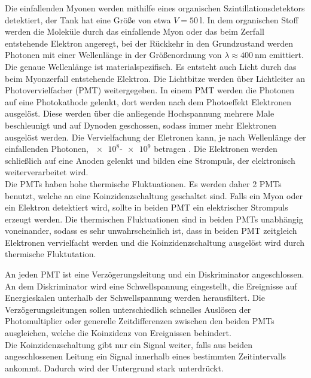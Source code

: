 \noindent Die einfallenden Myonen werden mithilfe eines organischen Szintillationsdetektors detektiert, der Tank hat eine Größe von etwa $V = \SI{50}{\litre}$. 
In dem organischen Stoff werden die Moleküle durch das einfallende Myon oder das beim Zerfall entstehende Elektron angeregt, 
bei der Rückkehr in den Grundzustand werden Photonen mit einer Wellenlänge in der Größenordnung von $\lambda \approx \SI{400}{\nano\metre}$ \cite{kalonoski} emittiert. 
Die genaue Wellenlänge ist materialspezifisch.  Es entsteht 
auch Licht durch das beim Myonzerfall entstehende Elektron. Die Lichtbitze werden über Lichtleiter an Photovervielfacher (PMT) weitergegeben. In einem PMT werden die Photonen auf eine 
Photokathode gelenkt, dort werden nach dem Photoeffekt Elektronen ausgelöst. Diese werden über die anliegende Hochspannung mehrere Male beschleunigt und auf Dynoden geschossen, sodass 
immer mehr Elektronen ausgelöst werden. Die Vervielfachung der Eletronen kann, je nach Wellenlänge der einfallenden Photonen, $\num{e8}$-$\num{e9}$ betragen \cite{kalonoski}.
Die Elektronen werden schließlich auf eine Anoden gelenkt und bilden eine Strompuls, der elektronisch weiterverarbeitet wird. \\
Die PMTs haben hohe thermische Fluktuationen. Es werden daher 2 PMTs benutzt, welche an eine Koinzidenzschaltung geschaltet sind. Falls ein Myon oder ein Elektron detektiert wird, sollte 
in beiden PMT ein elektrischer Strompuls erzeugt werden. Die thermischen Fluktuationen sind in beiden PMTs unabhängig voneinander, sodass es sehr unwahrscheinlich ist, dass in beiden PMT 
zeitgleich Elektronen vervielfacht werden und die Koinzidenzschaltung ausgelöst wird durch thermische Fluktutation. 

\noindent An jeden PMT ist eine Verzögerungsleitung und ein Diskriminator angeschlossen. An dem Diskriminator wird eine Schwellspannung eingestellt, die Ereignisse auf Energieskalen unterhalb 
der Schwellspannung werden herausfiltert. Die Verzögerungsleitungen sollen unterschiedlich schnelles Auslösen der Photomultiplier oder generelle Zeitdifferenzen zwischen den beiden PMTs 
ausgleichen, welche die Koinzidenz von Ereignissen behindert.\\
Die Koinzidenzschaltung gibt nur ein Signal weiter, falls aus beiden angeschlossenen Leitung ein Signal innerhalb eines bestimmten Zeitintervalls ankommt. Dadurch wird der Untergrund 
stark unterdrückt.\\

